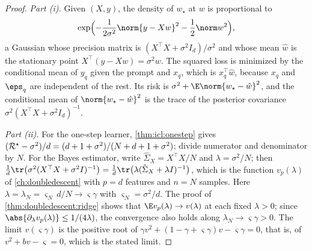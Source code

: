 \begin{refsection}

\begin{proof}
\emph{Part (i).} Given $(X,y)$, the density of $w_\star$ at $w$ is proportional to
\[
  \exp\Bigl(-\frac1{2\sigma^2}\norm{y-Xw}^2-\frac12\norm w^2\Bigr),
\]
a Gaussian whose precision matrix is $(X^\top X+\sigma^2I_d)/\sigma^2$ and whose mean $\hat w$ is the stationary point $X^\top(y-Xw)=\sigma^2w$. The squared loss is minimized by the conditional mean of $y_q$ given the prompt and $x_q$, which is $x_q^\top\hat w$, because $x_q$ and $\eps_q$ are independent of the rest. Its risk is $\sigma^2+\E\norm{w_\star-\hat w}^2$, and the conditional mean of $\norm{w_\star-\hat w}^2$ is the trace of the posterior covariance $\sigma^2(X^\top X+\sigma^2I_d)^{-1}$.

\emph{Part (ii).} For the one-step learner, \cref{thm:icl:onestep} gives $(\mathcal{R}^\star-\sigma^2)/d=(d+1+\sigma^2)/(N+d+1+\sigma^2)$; divide numerator and denominator by $N$. For the Bayes estimator, write $\hat\Sigma_X=X^\top X/N$ and $\lambda=\sigma^2/N$; then $\frac1d\tr\bigl(\sigma^2(X^\top X+\sigma^2I)^{-1}\bigr)=\frac1d\tr\bigl(\lambda(\hat\Sigma_X+\lambda I)^{-1}\bigr)$, which is the function $v_p(\lambda)$ of \cref{ch:doubledescent} with $p=d$ features and $n=N$ samples. Here $\lambda=\lambda_N=\varsigma_N\,d/N\to\varsigma\gamma$ with $\varsigma_N=\sigma^2/d$. The proof of \cref{thm:doubledescent:ridge} shows that $\E v_p(\lambda)\to v(\lambda)$ at each fixed $\lambda>0$; since $\abs{\partial_\lambda v_p(\lambda)}\le1/(4\lambda)$, the convergence also holds along $\lambda_N\to\varsigma\gamma>0$. The limit $v(\varsigma\gamma)$ is the positive root of $\gamma v^2+(1-\gamma+\varsigma\gamma)v-\varsigma\gamma=0$, that is, of $v^2+bv-\varsigma=0$, which is the stated limit.


\end{proof}
\end{refsection}

